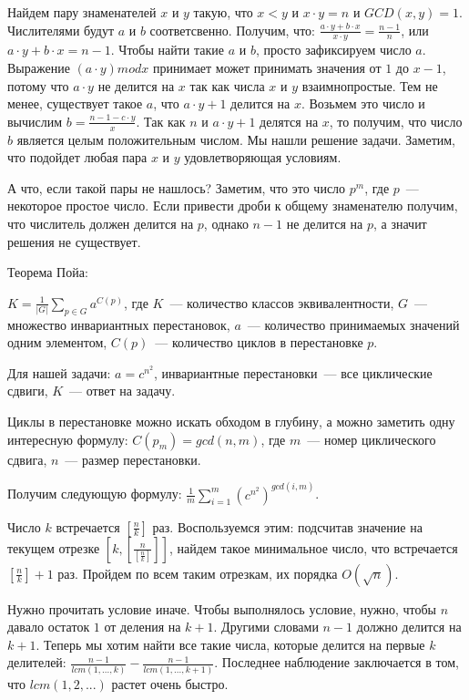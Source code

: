 \documentclass[12pt]{article}
\begin{document}

Найдем пару знаменателей $x$ и $y$ такую, что $x < y$ и $x \cdot y = n$ и $GCD(x, y) = 1$.
Числителями будут $a$ и $b$ соответсвенно. Получим, что:
$\frac{a \cdot y + b \cdot x}{x \cdot y} = \frac{n - 1}{n}$, или $a \cdot y + b \cdot x = n - 1$.
Чтобы найти такие $a$ и $b$, просто зафиксируем число $a$. Выражение $(a \cdot y) mod x$ принимает
может принимать значения от $1$ до $x - 1$, потому что $a \cdot y$ не делится на $x$ так как числа 
$x$ и $y$ взаимнопростые. Тем не менее, существует такое $a$, что $a \cdot y + 1$ делится на $x$. Возьмем это
число и вычислим $b = \frac{n - 1 - c \cdot y}{x}$. Так как $n$ и $a \cdot y + 1$ делятся на $x$, то получим,
что число $b$ является целым положительным числом. Мы нашли решение задачи. Заметим, что подойдет любая
пара $x$ и $y$ удовлетворяющая условиям.

А что, если такой пары не нашлось? Заметим, что это число $p^{m}$, где $p$~--- некоторое простое число.
Если привести дроби к общему знаменателю получим, что числитель должен делится на $p$, однако $n - 1$ не
делится на $p$, а значит решения не существует.

\EndEditorial
{}

Теорема Пойа:

$K = \frac{1}{|G|} \sum_{p \in G} a^{C(p)}$, где $K$~---
количество классов эквивалентности, $G$~--- множество инвариантных перестановок,
$a$~--- количество принимаемых значений одним элементом,
$C(p)$~--- количество циклов в перестановке $p$.

Для нашей задачи: $a = c^{n^2}$, инвариантные перестановки~--- все циклические сдвиги,
$K$~--- ответ на задачу.

Циклы в перестановке можно искать обходом в глубину, а можно заметить одну интересную
формулу: $C(p_m) = gcd(n, m)$, где $m$~--- номер циклического сдвига, $n$~--- размер перестановки.

Получим следующую формулу: $\frac{1}{m} \sum_{i = 1}^{m} (c^{n^2})^{gcd(i, m)}$.

\EndEditorial
{}

Число $k$ встречается $[\frac{n}{k}]$ раз. Воспользуемся этим: подсчитав значение на текущем отрезке
$[k, [\frac{n}{[\frac{n}{k}]}]]$, найдем такое минимальное число, что встречается $[\frac{n}{k}] + 1$ раз.
Пройдем по всем таким отрезкам, их порядка $O(\sqrt n)$.

\EndEditorial
{}

Нужно прочитать условие иначе. Чтобы выполнялось условие, нужно, чтобы $n$ давало остаток $1$ от деления на $k + 1$.
Другими словами $n - 1$ должно делится на $k + 1$. Теперь мы хотим найти все такие числа, которые делится на первые $k$ делителей:
$\frac{n - 1}{lcm(1, ..., k)} - \frac{n - 1}{lcm(1, ..., k + 1)}$. Последнее наблюдение заключается в том, что $lcm(1, 2, ...)$
растет очень быстро.

\EndEditorial
\end{document}
